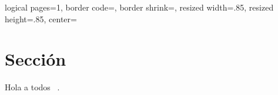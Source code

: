 \documentclass[a4paper,10pt,oneside]{article}
\title{\titulo}
\author{Autor: \autor\\Docente: \docente}
\date{} %
\begin{document}
{
  \edef\pgfpageoptionborder{0pt}
}
{
  \pgfpagesphysicalpageoptions
  {%
    logical pages=1,%
  }
  {
    border code=\pgfsetlinewidth{2pt}\pgfstroke,%
    border shrink=\pgfpageoptionborder,%
    resized width=.85\pgfphysicalwidth,%
    resized height=.85\pgfphysicalheight,%
    center=\pgfpoint{.5\pgfphysicalwidth}{.5\pgfphysicalheight}%
  }%
}

\maketitle
\thispagestyle{fancy}

\section{Secci\'on}
Hola a todos ~\cite{0068780}.

{}


% 
% 
% 
% 
\end{document}
